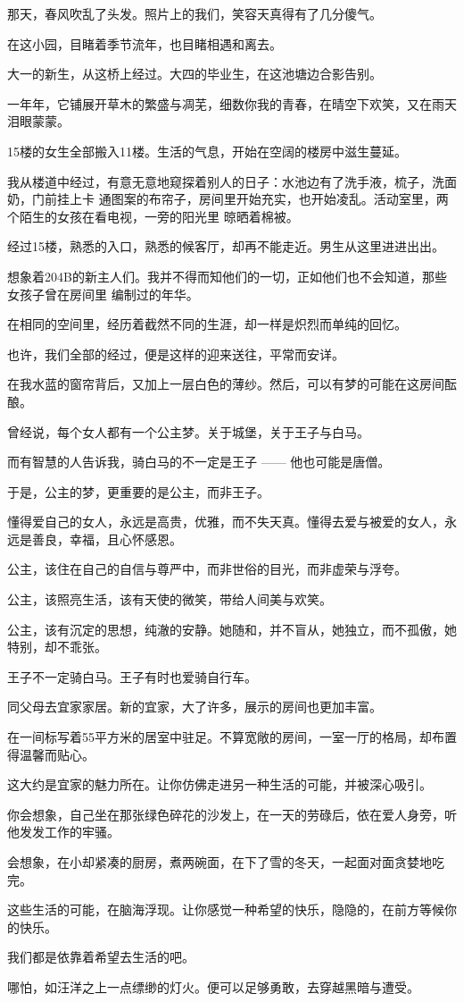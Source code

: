 		那天，春风吹乱了头发。照片上的我们，笑容天真得有了几分傻气。\par
		在这小园，目睹着季节流年，也目睹相遇和离去。\par
		大一的新生，从这桥上经过。大四的毕业生，在这池塘边合影告别。\par
		一年年，它铺展开草木的繁盛与凋芜，细数你我的青春，在晴空下欢笑，又在雨天泪眼蒙蒙。


		15楼的女生全部搬入11楼。生活的气息，开始在空阔的楼房中滋生蔓延。

		我从楼道中经过，有意无意地窥探着别人的日子：水池边有了洗手液，梳子，洗面奶，门前挂上卡
	通图案的布帘子，房间里开始充实，也开始凌乱。活动室里，两个陌生的女孩在看电视，一旁的阳光里
	晾晒着棉被。

		经过15楼，熟悉的入口，熟悉的候客厅，却再不能走近。男生从这里进进出出。

		想象着204B的新主人们。我并不得而知他们的一切，正如他们也不会知道，那些女孩子曾在房间里
	编制过的年华。

		在相同的空间里，经历着截然不同的生涯，却一样是炽烈而单纯的回忆。

		也许，我们全部的经过，便是这样的迎来送往，平常而安详。


		在我水蓝的窗帘背后，又加上一层白色的薄纱。然后，可以有梦的可能在这房间酝酿。\par
		曾经说，每个女人都有一个公主梦。关于城堡，关于王子与白马。\par
		而有智慧的人告诉我，骑白马的不一定是王子 —— 他也可能是唐僧。\par
		于是，公主的梦，更重要的是公主，而非王子。\par
		懂得爱自己的女人，永远是高贵，优雅，而不失天真。懂得去爱与被爱的女人，永远是善良，幸福，且心怀感恩。\par
		公主，该住在自己的自信与尊严中，而非世俗的目光，而非虚荣与浮夸。\par
		公主，该照亮生活，该有天使的微笑，带给人间美与欢笑。\par
		公主，该有沉定的思想，纯澈的安静。她随和，并不盲从，她独立，而不孤傲，她特别，却不乖张。\par
		王子不一定骑白马。王子有时也爱骑自行车。


		同父母去宜家家居。新的宜家，大了许多，展示的房间也更加丰富。\par
		在一间标写着55平方米的居室中驻足。不算宽敞的房间，一室一厅的格局，却布置得温馨而贴心。\par
		这大约是宜家的魅力所在。让你仿佛走进另一种生活的可能，并被深心吸引。\par
		你会想象，自己坐在那张绿色碎花的沙发上，在一天的劳碌后，依在爱人身旁，听他发发工作的牢骚。\par
		会想象，在小却紧凑的厨房，煮两碗面，在下了雪的冬天，一起面对面贪婪地吃完。\par
		这些生活的可能，在脑海浮现。让你感觉一种希望的快乐，隐隐的，在前方等候你的快乐。\par
		我们都是依靠着希望去生活的吧。\par
		哪怕，如汪洋之上一点缥缈的灯火。便可以足够勇敢，去穿越黑暗与遭受。

